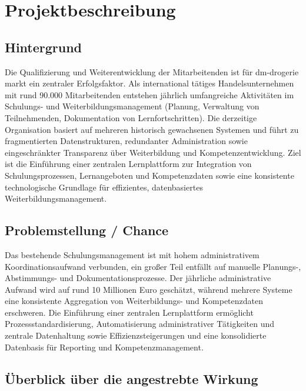 \chapter{Projektbeschreibung}
\label{chap:projektbeschreibung}

\section{Hintergrund}

Die Qualifizierung und Weiterentwicklung der Mitarbeitenden ist für
dm-drogerie markt ein zentraler Erfolgsfaktor. Als international
tätiges Handelsunternehmen mit rund 90.000 Mitarbeitenden entstehen
jährlich umfangreiche Aktivitäten im Schulungs- und Weiterbildungsmanagement
(Planung, Verwaltung von Teilnehmenden, Dokumentation von Lernfortschritten).
Die derzeitige Organisation basiert auf mehreren historisch gewachsenen
Systemen und führt zu fragmentierten Datenstrukturen, redundanter
Administration sowie eingeschränkter Transparenz über Weiterbildung und
Kompetenzentwicklung. Ziel ist die Einführung einer zentralen Lernplattform
zur Integration von Schulungsprozessen, Lernangeboten und Kompetenzdaten
sowie eine konsistente technologische Grundlage für effizientes,
datenbasiertes Weiterbildungsmanagement.

\section{Problemstellung / Chance}

Das bestehende Schulungsmanagement ist mit hohem administrativem
Koordinationsaufwand verbunden, ein großer Teil entfällt auf manuelle
Planungs-, Abstimmungs- und Dokumentationsprozesse. Der jährliche
administrative Aufwand wird auf rund 10 Millionen Euro geschätzt, während
mehrere Systeme eine konsistente Aggregation von Weiterbildungs- und
Kompetenzdaten erschweren. Die Einführung einer zentralen Lernplattform
ermöglicht Prozessstandardisierung, Automatisierung administrativer
Tätigkeiten und zentrale Datenhaltung sowie Effizienzsteigerungen und eine
konsolidierte Datenbasis für Reporting und Kompetenzmanagement.

\newpage
\section{Überblick über die angestrebte Wirkung}

